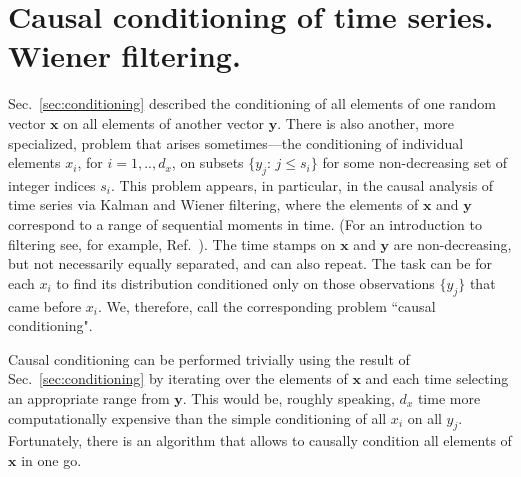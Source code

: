 \documentclass[a4paper,notitlepage]{article}
\renewcommand{\b}[1]{\mathbf{#1}}
\newcommand{\secref}[1]{Sec.~\ref{#1}}
\begin{document}
\section{Causal conditioning of time series. Wiener filtering.}


\secref{sec:conditioning} described the conditioning of all elements of one random vector $\b{x}$ on all elements of another vector $\b{y}$. There is also another, more specialized, problem that arises sometimes---the conditioning of individual elements $x_i$, for $i=1,..,d_x$, on subsets $\{y_j:\, j\le s_i\}$ for some non-decreasing set of integer indices $s_i$.  This problem appears, in particular, in the causal analysis of time series via Kalman and Wiener filtering, where the elements of $\b{x}$ and $\b{y}$ correspond to a range of sequential moments in time. (For an introduction to filtering see, for example, Ref.~\cite{brown_introduction_1983}). The time stamps on $\b{x}$ and $\b{y}$ are non-decreasing, but not necessarily equally separated, and can also repeat. The task can be for each $x_i$ to find its distribution conditioned only on those observations $\{y_j\}$ that came before $x_i$. We, therefore, call the corresponding problem ``causal conditioning".  


Causal conditioning can be performed trivially using the result of \secref{sec:conditioning} by iterating over the elements of $\b{x}$ and each time selecting an appropriate range from $\b{y}$. This would be, roughly speaking, $d_x$ time more computationally expensive than the simple conditioning of all $x_i$ on all $y_j$. Fortunately, there is an algorithm that allows to causally condition all elements of $\b{x}$ in one go.
\end{document}
